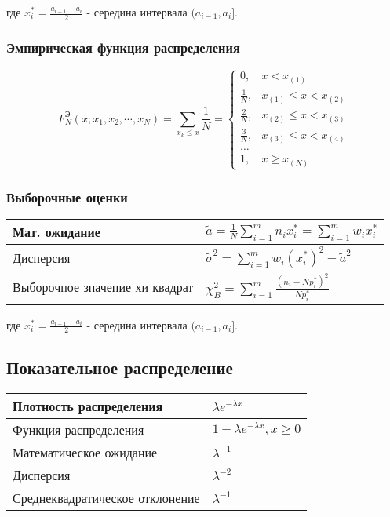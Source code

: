 где $x_i^* = \frac{a_{i-1} + a_i}{2}$ - середина интервала $(a_{i-1}, a_i]$.
\subsubsection{Эмпирическая функция распределения}
\begin{equation*}
F_N^{\text{Э}}(x; x_1, x_2, \cdots, x_N)= \sum\limits_{x_k \leq x}\frac{1}{N} = 
\begin{cases}
0, &x<x_{(1)}\\
\frac{1}{N}, &x_{(1)} \leq x < x_{(2)} \\
\frac{2}{N}, &x_{(2)} \leq x < x_{(3)} \\
\frac{3}{N}, &x_{(3)} \leq x < x_{(4)} \\
\dots \\
1, & x \geq x_{(N)}
\end{cases}
\end{equation*}

\subsubsection{Выборочные оценки}
    \begin{tabular}{|l|l|}
    \hline
    Мат. ожидание& $\widetilde{a} = \frac{1}{N}\sum\limits_{i=1}^mn_ix_i^* = \sum\limits_{i=1}^m w_ix_i^*$\\
    \hline
    Дисперсия& $\widetilde{\sigma}^2 = \sum\limits_{i=1}^mw_i(x_i^*)^2 - \widetilde{a}^2$ \\
    \hline
    Выборочное значение хи-квадрат& $\chi^2_{B} = \sum\limits_{i=1}^m\frac{(n_i-Np_i^*)^2}{Np_i^*}$\\
    \hline
    \end{tabular}

где $x_{i}^* = \frac{a_{i-1} +a_i}{2}$ - середина интервала $(a_{i-1}, a_i]$.

\subsection{Показательное распределение}
    \begin{tabular}{|l|l|}
    \hline
    Плотность распределения& $\lambda e^{-\lambda x}$\\
    \hline
    Функция распределения& $1 - \lambda e^{-\lambda x}, x \geq 0$\\
    \hline
    Математическое ожидание&  $\lambda^{-1}$\\
    \hline
    Дисперсия&  $\lambda^{-2}$\\
    \hline
    Среднеквадратическое отклонение&  $\lambda^{-1}$\\
    \hline
    \end{tabular}


